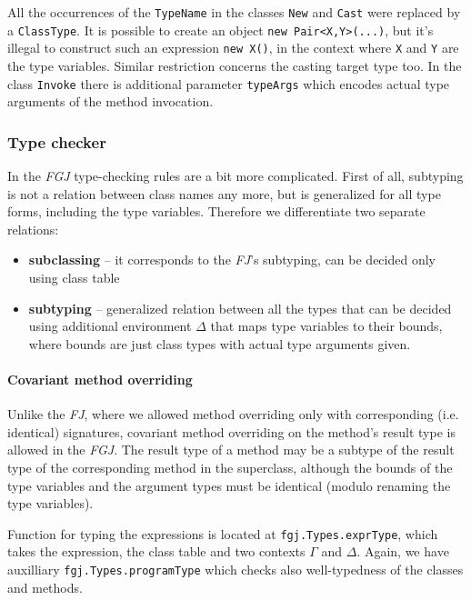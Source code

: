 \documentclass{article}[12pt]
\begin{document}
All the occurrences of the \texttt{TypeName} in the classes \texttt{New}
and \texttt{Cast} were replaced by a \texttt{ClassType}. It is possible
to create an object \texttt{new Pair<X,Y>(...)}, but it's illegal
to construct such an expression \texttt{new X()}, in the context
where \texttt{X} and \texttt{Y} are the type variables. Similar
restriction concerns the casting target type too. In the class \texttt{Invoke} there is additional parameter \texttt{typeArgs}
which encodes actual type arguments of the method invocation.

\subsubsection{Type checker}

In the \emph{FGJ} type-checking rules are a bit more complicated.
First of all, subtyping is not a relation between class names any
more, but is generalized for all type forms, including the type
variables. Therefore we differentiate two separate relations:

\begin{itemize}
\item{\textbf{subclassing}} -- it corresponds to the \emph{FJ}'s
  subtyping, can be decided only using class table
\item{\textbf{subtyping}} -- generalized relation between all
  the types that can be decided using additional environment $\Delta$
  that maps type variables to their bounds, where bounds are
  just class types with actual type arguments given.
\end{itemize}

\paragraph{Covariant method overriding}

Unlike the \emph{FJ}, where we allowed method overriding only with
corresponding (i.e. identical) signatures, covariant method overriding
on the method's result type is allowed in the \emph{FGJ}. The result
type of a method may be a subtype of the result type of the
corresponding method in the superclass, although the bounds of
the type variables and the argument types must be identical (modulo
renaming the type variables).

Function for typing the expressions is located at
\texttt{fgj.Types.exprType}, which takes the expression, the class
table and two contexts $\Gamma$ and $\Delta$. Again, we have
auxilliary \texttt{fgj.Types.programType} which checks also
well-typedness of the classes and methods.
\end{document}
